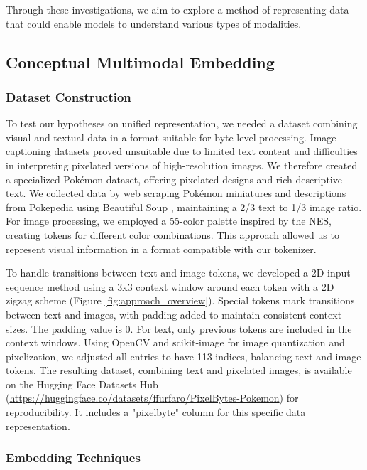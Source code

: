 \documentclass[10pt,a4paper]{article}
\begin{document}
Through these investigations, we aim to explore a method of representing data that could enable models to understand various types of modalities.

\subsection{Conceptual Multimodal Embedding}

\subsubsection{Dataset Construction}

To test our hypotheses on unified representation, we needed a dataset combining visual and textual data in a format suitable for byte-level processing. Image captioning datasets proved unsuitable due to limited text content and difficulties in interpreting pixelated versions of high-resolution images. We therefore created a specialized Pokémon dataset, offering pixelated designs and rich descriptive text. We collected data by web scraping Pokémon miniatures and descriptions from Pokepedia using Beautiful Soup \cite{richardson2007beautiful}, maintaining a 2/3 text to 1/3 image ratio. For image processing, we employed a 55-color palette inspired by the NES, creating tokens for different color combinations. This approach allowed us to represent visual information in a format compatible with our tokenizer.

\sloppy

To handle transitions between text and image tokens, we developed a 2D input sequence method using a 3x3 context window around each token with a 2D zigzag scheme (Figure \ref{fig:approach_overview}). Special tokens mark transitions between text and images, with padding added to maintain consistent context sizes. The padding value is 0. For text, only previous tokens are included in the context windows. Using OpenCV and scikit-image \cite{bradski2000opencv, van2014scikit} for image quantization and pixelization, we adjusted all entries to have 113 indices, balancing text and image tokens. The resulting dataset, combining text and pixelated images, is available on the Hugging Face Datasets Hub (\url{https://huggingface.co/datasets/ffurfaro/PixelBytes-Pokemon}) for reproducibility. It includes a "pixelbyte" column for this specific data representation.

\subsubsection{Embedding Techniques}
\end{document}

